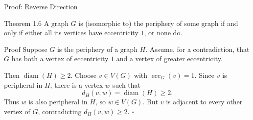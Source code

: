 \documentclass[aspectratio=169,11pt]{beamer}
\begin{document}
\begin{frame}[t]{Proof: Reverse Direction}
\large
\vspace{0.10cm}
\begin{block}{Theorem 1.6}
A graph $G$ is (isomorphic to) the periphery of some graph if and only if
either all its vertices have eccentricity $1$, or none do.
\end{block}

\normalsize
\begin{block}{Proof}
Suppose $G$ is the periphery of a graph $H$.
Assume, for a contradiction, that $G$ has both a vertex of eccentricity $1$
and a vertex of greater eccentricity.

\medskip
Then $\operatorname{diam}(H)\geq2$.
Choose $v\in V(G)$ with $\operatorname{ecc}_G(v)=1$.
Since $v$ is peripheral in $H$, there is a vertex $w$ such that
\[
  d_H(v,w)=\operatorname{diam}(H)\geq2.
\]
Thus $w$ is also peripheral in $H$, so $w\in V(G)$.
But $v$ is adjacent to every other vertex of $G$, contradicting $d_H(v,w)\geq2$.
\hfill$\square$
\end{block}
\end{frame}
\end{document}
